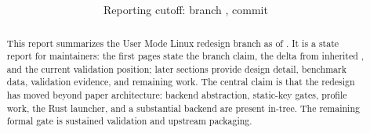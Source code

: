 \documentclass[11pt]{article}
\title{\textbf{\ProjectTitle}\\[0.35em]\large \ProjectSubtitle}
\author{Reporting cutoff: branch \texttt{\BranchName}, commit \texttt{\CutoffCommit}}
\date{\ReportDate}
\begin{document}
\maketitle
\begin{center}
\end{center}

\begin{abstract}
This report summarizes the User Mode Linux redesign branch as of
\ReportDate. It is a state report for maintainers: the first pages
state the branch claim, the delta from inherited \UML{}, and the
current validation position; later sections provide design detail,
benchmark data, validation evidence, and remaining work. The central
claim is that the redesign has moved beyond paper architecture:
backend abstraction, static-key gates, profile work, the Rust launcher,
and a substantial \KVMvTwo{} backend are present in-tree. The remaining
formal gate is sustained validation and upstream packaging.
\end{abstract}

\newpage


\newpage
\tableofcontents
\newpage










\printbibliography
\end{document}
